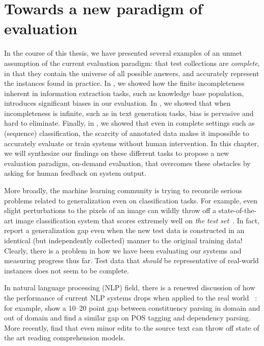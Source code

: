 \chapter[Towards a new paradigm of evaluation]{\label{chap:discussion} Towards a new paradigm of evaluation}

In the course of this thesis, we have presented several examples of an unmet assumption of the current evaluation paradigm: that test collections are \textit{complete}, in that they contain the universe of all possible answers, and accurately represent the instances found in practice.
In , we showed how the finite incompleteness inherent in information extraction tasks, such as knowledge base population, introduces significant biases in our evaluation.
In , we showed that when incompleteness is infinite, such as in text generation tasks, bias is pervasive and hard to eliminate.
Finally, in , we showed that even in complete settings such as (sequence) classification, the scarcity of annotated data makes it impossible to accurately evaluate or train systems without human intervention.
In this chapter, we will synthesize our findings on these different tasks to propose a new evaluation paradigm, on-demand evaluation, that overcomes these obstacles by asking for human feedback on system output.

More broadly, the machine learning community is trying to reconcile serious problems related to generalization even on classification tasks.
For example, even slight perturbations to the pixels of an image can wildly throw off a state-of-the-art image classification system that scores extremely well on \textit{the test set}~\citep{goodfellow2015explaining,carlini2016defensive,carlini2017adversarial}.
In fact, \citet{recht2018cifar} report a generalization gap even when the new test data is constructed in an identical (but independently collected) manner to the original training data!
Clearly, there is a problem in how we have been evaluating our systems and measuring progress thus far.
Test data that \textit{should} be representative of real-world instances does not seem to be complete.

In  natural language processing (NLP) field,
  there is a renewed discussion of how the performance of current NLP systems drops when applied to the real world~\citet{plank16nonstandard} :
for example, \citet{mcclosky2010any} show a 10--20 point gap between constituency parsing in domain and out of domain and \citet{foster2011news} find a similar gap on POS tagging and dependency parsing.
More recently, \citet{jia2017adversarial} find that even minor edits to the source text can throw off state of the art reading comprehension models.

